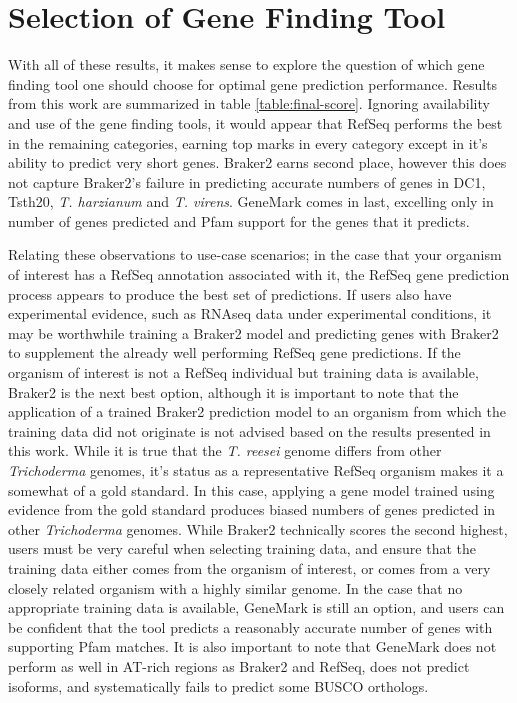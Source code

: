 \section{Selection of Gene Finding Tool}

With all of these results, it makes sense to explore the question of
which gene finding tool one should choose for optimal gene prediction
performance. Results from this work are summarized in table
\ref{table:final-score}. Ignoring availability and use of the gene
finding tools, it would appear that RefSeq performs the best in the
remaining categories, earning top marks in every category except in
it's ability to predict very short genes. Braker2 earns second place,
however this does not capture Braker2's failure in predicting accurate
numbers of genes in DC1, Tsth20, \textit{T. harzianum} and
\textit{T. virens}. GeneMark comes in last, excelling only in number
of genes predicted and Pfam support for the genes that it predicts.

Relating these observations to use-case scenarios; in the case that
your organism of interest has a RefSeq annotation associated with it,
the RefSeq gene prediction process appears to produce the best set of
predictions. If users also have experimental evidence, such as RNAseq
data under experimental conditions, it may be worthwhile training a
Braker2 model and predicting genes with Braker2 to supplement the
already well performing RefSeq gene predictions. If the organism of
interest is not a RefSeq individual but training data is available,
Braker2 is the next best option, although it is important to note that
the application of a trained Braker2 prediction model to an organism
from which the training data did not originate is not advised based on
the results presented in this work. While it is true that the
\textit{T. reesei} genome differs from other \textit{Trichoderma}
genomes, it's status as a representative RefSeq organism makes it a
somewhat of a gold standard. In this case, applying a gene model
trained using evidence from the gold standard produces biased numbers
of genes predicted in other \textit{Trichoderma} genomes. While
Braker2 technically scores the second highest, users must be very
careful when selecting training data, and ensure that the training
data either comes from the organism of interest, or comes from a very
closely related organism with a highly similar genome. In the case
that no appropriate training data is available, GeneMark is still an
option, and users can be confident that the tool predicts a reasonably
accurate number of genes with supporting Pfam matches. It is also
important to note that GeneMark does not perform as well in AT-rich
regions as Braker2 and RefSeq, does not predict isoforms, and
systematically fails to predict some BUSCO orthologs.

